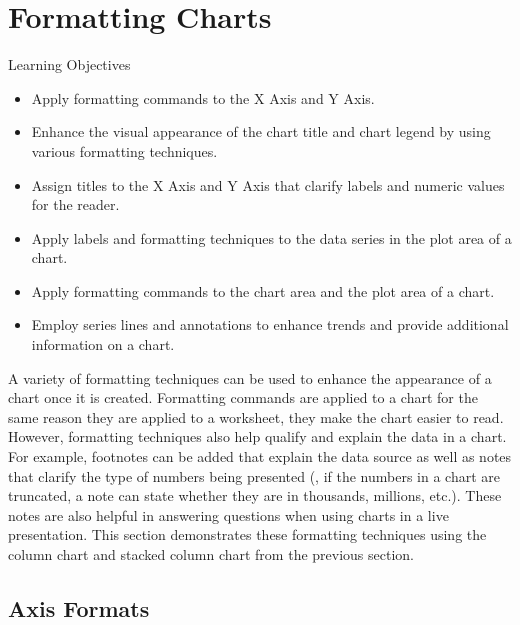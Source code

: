 \section{Formatting Charts}

\begin{center}
	\begin{objbox}{Learning Objectives}
		\begin{itemize}
			\setlength{\itemsep}{0pt}
			\setlength{\parskip}{0pt}
			\setlength{\parsep}{0pt}

			\item Apply formatting commands to the X Axis and Y Axis.
			\item Enhance the visual appearance of the chart title and chart legend by using various formatting techniques.
			\item Assign titles to the X Axis and Y Axis that clarify labels and numeric values for the reader.
			\item Apply labels and formatting techniques to the data series in the plot area of a chart.
			\item Apply formatting commands to the chart area and the plot area of a chart.
			\item Employ series lines and annotations to enhance trends and provide additional information on a chart.
			
		\end{itemize}
	\end{objbox}
\end{center}

A variety of formatting techniques can be used to enhance the appearance of a chart once it is created. Formatting commands are applied to a chart for the same reason they are applied to a worksheet, they make the chart easier to read. However, formatting techniques also help qualify and explain the data in a chart. For example, footnotes can be added that explain the data source as well as notes that clarify the type of numbers being presented (\ie, if the numbers in a chart are truncated, a note can state whether they are in thousands, millions, etc.). These notes are also helpful in answering questions when using charts in a live presentation. This section demonstrates these formatting techniques using the column chart and stacked column chart from the previous section.

\subsection{Axis Formats}

